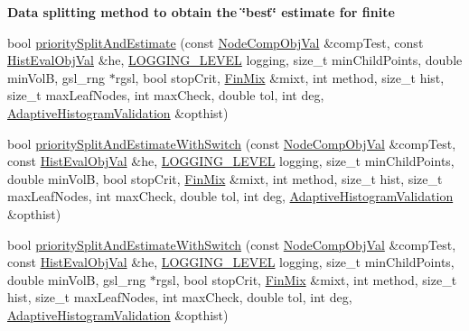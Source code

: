 \begin{Indent}{\bf \-Data splitting method to obtain the \char`\"{}best\char`\"{} estimate for finite}
\begin{DoxyCompactItemize}
\item 
bool \hyperlink{classsubpavings_1_1AdaptiveHistogramValidation_a990028dc08bc4780df6a04f78b4ec644}{priority\-Split\-And\-Estimate} (const \hyperlink{classsubpavings_1_1NodeCompObjVal}{\-Node\-Comp\-Obj\-Val} \&comp\-Test, const \hyperlink{classsubpavings_1_1HistEvalObjVal}{\-Hist\-Eval\-Obj\-Val} \&he, \hyperlink{namespacesubpavings_aef8e51096b59ecaf1a1e9b2ee24b6089}{\-L\-O\-G\-G\-I\-N\-G\-\_\-\-L\-E\-V\-E\-L} logging, size\-\_\-t min\-Child\-Points, double min\-Vol\-B, gsl\-\_\-rng $\ast$rgsl, bool stop\-Crit, \hyperlink{structFinMix}{\-Fin\-Mix} \&mixt, int method, size\-\_\-t hist, size\-\_\-t max\-Leaf\-Nodes, int max\-Check, double tol, int deg, \hyperlink{classsubpavings_1_1AdaptiveHistogramValidation}{\-Adaptive\-Histogram\-Validation} \&opthist)
\item 
bool \hyperlink{classsubpavings_1_1AdaptiveHistogramValidation_a8f39563ed08722fbe6be55474681abd5}{priority\-Split\-And\-Estimate\-With\-Switch} (const \hyperlink{classsubpavings_1_1NodeCompObjVal}{\-Node\-Comp\-Obj\-Val} \&comp\-Test, const \hyperlink{classsubpavings_1_1HistEvalObjVal}{\-Hist\-Eval\-Obj\-Val} \&he, \hyperlink{namespacesubpavings_aef8e51096b59ecaf1a1e9b2ee24b6089}{\-L\-O\-G\-G\-I\-N\-G\-\_\-\-L\-E\-V\-E\-L} logging, size\-\_\-t min\-Child\-Points, double min\-Vol\-B, bool stop\-Crit, \hyperlink{structFinMix}{\-Fin\-Mix} \&mixt, int method, size\-\_\-t hist, size\-\_\-t max\-Leaf\-Nodes, int max\-Check, double tol, int deg, \hyperlink{classsubpavings_1_1AdaptiveHistogramValidation}{\-Adaptive\-Histogram\-Validation} \&opthist)
\item 
bool \hyperlink{classsubpavings_1_1AdaptiveHistogramValidation_a6bd25ba3a874dee64a2fd93984542f39}{priority\-Split\-And\-Estimate\-With\-Switch} (const \hyperlink{classsubpavings_1_1NodeCompObjVal}{\-Node\-Comp\-Obj\-Val} \&comp\-Test, const \hyperlink{classsubpavings_1_1HistEvalObjVal}{\-Hist\-Eval\-Obj\-Val} \&he, \hyperlink{namespacesubpavings_aef8e51096b59ecaf1a1e9b2ee24b6089}{\-L\-O\-G\-G\-I\-N\-G\-\_\-\-L\-E\-V\-E\-L} logging, size\-\_\-t min\-Child\-Points, double min\-Vol\-B, gsl\-\_\-rng $\ast$rgsl, bool stop\-Crit, \hyperlink{structFinMix}{\-Fin\-Mix} \&mixt, int method, size\-\_\-t hist, size\-\_\-t max\-Leaf\-Nodes, int max\-Check, double tol, int deg, \hyperlink{classsubpavings_1_1AdaptiveHistogramValidation}{\-Adaptive\-Histogram\-Validation} \&opthist)
\end{DoxyCompactItemize}
\end{Indent}
